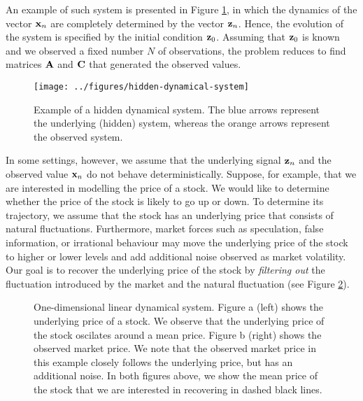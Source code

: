 \documentclass[11pt]{article}
\numberwithin{equation}{section}
\newcommand{\x}{{\bf x}}
\newcommand{\z}{{\bf z}}
\begin{document}
An example of such system is presented in Figure \ref{fig:hidden-dynamical-system}, in which the dynamics of the vector $\x_n$ are completely determined by the vector $\z_n$. Hence, the evolution of the system is specified by the initial condition $\z_0$. Assuming that $\z_0$ is known and we observed a fixed number $N$ of observations, the problem reduces to find matrices ${\bf A}$ and ${\bf C}$ that generated the observed values.

\begin{figure}[h!]
	\centering
	\texttt{[image: ../figures/hidden-dynamical-system]}
	\caption{Example of a hidden dynamical system. The blue arrows represent the underlying (hidden) system, whereas the orange arrows represent the observed system.}
	\label{fig:hidden-dynamical-system}
\end{figure}

In some settings, however, we assume that the underlying signal $\z_n$ and the observed value $\x_n$ do not behave deterministically. Suppose, for example, that we are interested in modelling the price of a stock. We would like to determine whether the price of the stock is likely to go up or down. To determine its trajectory, we assume that the stock has an underlying price that consists of natural fluctuations. Furthermore, market forces such as speculation, false information, or irrational behaviour may move the underlying price of the stock to higher or lower levels and add additional noise observed as market volatility. Our goal is to recover the underlying price of the stock by \textit{filtering out} the fluctuation introduced by the market and the natural fluctuation (see Figure \ref{fig:1d-stock-system}).

\begin{figure}[h!]
	\hfill
	\hfill
	\hfill
	\caption{One-dimensional linear dynamical system. Figure a (left) shows the underlying price of a stock. We observe that the underlying price of the stock oscilates around a mean price. Figure b (right) shows the observed market price. We note that the observed market price in this example closely follows the underlying price, but has an additional noise. In both figures above, we show the mean price of the stock that we are interested in recovering in dashed black lines.}
	\label{fig:1d-stock-system}
\end{figure}
\end{document}
